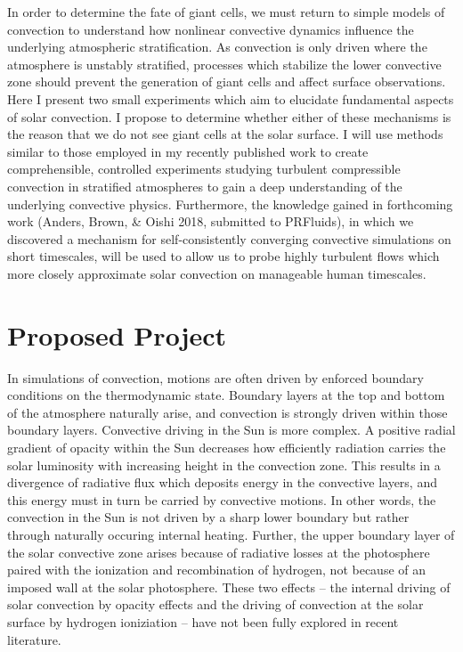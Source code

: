 \documentclass[aasms,12pt]{article}
\begin{document}
In order to determine the fate of giant cells, we must return to simple models of convection to
understand how nonlinear convective dynamics influence the underlying atmospheric stratification.
As convection is only driven where the atmosphere is unstably stratified, processes which stabilize the lower convective
zone should prevent the generation of giant cells and affect surface observations.
Here I present two small experiments which aim to elucidate fundamental aspects of solar
convection. I propose to determine whether either of these mechanisms is the reason that we do not see giant cells
at the solar surface. I will use methods similar to those employed in my recently published work
\citep{anders&brown2017} to create comprehensible, controlled experiments studying turbulent
compressible convection in stratified atmospheres 
to gain a deep understanding of the underlying convective physics.
Furthermore, the knowledge gained in forthcoming work (Anders, Brown, \& Oishi 2018, submitted to PRFluids),
in which we discovered a mechanism for self-consistently converging convective simulations on short timescales,
will be used to allow us to probe highly turbulent flows which more closely approximate solar convection on
manageable human timescales.

\section{Proposed Project}
In simulations of convection, motions are often driven by enforced boundary conditions
on the thermodynamic state.  Boundary layers at the top and bottom of the atmosphere naturally arise,
and convection is strongly driven within those boundary layers.  Convective driving in the Sun is more
complex. A positive radial gradient of opacity within the Sun decreases how efficiently radiation carries
the solar luminosity with increasing height in the convection zone.
This results in a divergence of radiative flux which deposits
energy in the convective layers, and this energy must in turn be carried by convective motions.
In other words, the convection in the Sun is not driven by a sharp lower boundary but rather
through naturally occuring internal heating.
Further, the upper boundary layer of the solar convective zone arises because of 
radiative losses at the photosphere paired with the ionization and 
recombination of hydrogen, not because of an imposed wall at the solar photosphere. These
two effects -- the internal driving of solar convection by opacity effects 
and the driving of convection at the solar surface 
by hydrogen ioniziation -- have not been fully explored in recent literature.
\end{document}

